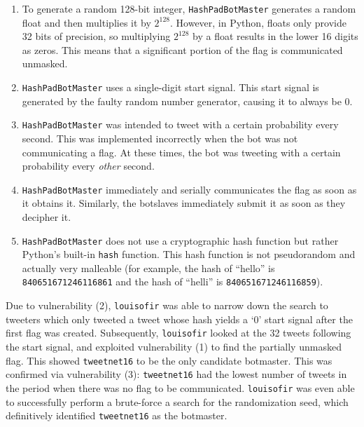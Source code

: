 \documentclass[11pt, oneside]{article} %
\numberwithin{equation}{section} %
\numberwithin{figure}{section} %
\numberwithin{table}{section} %
\renewcommand{\c}[1]{\texttt{#1}}
\newcommand{\teamol}{\c{louisofir}}
\begin{document}
            \begin{enumerate}
				\item To generate a random 128-bit integer, \c{HashPadBotMaster} generates a random float and then multiplies it by $2^{128}$. However, in Python, floats only provide 32 bits of precision, so multiplying $2^{128}$ by a float results in the lower 16 digits as zeros. This means that a significant portion of the flag is communicated unmasked.
                
				\item \c{HashPadBotMaster} uses a single-digit start signal.  This start signal is generated by the faulty random number generator, causing it to always be $0$.
                
				\item \c{HashPadBotMaster} was intended to tweet with a certain probability every second.  This was implemented incorrectly when the bot was not communicating a flag.  At these times, the bot was tweeting with a certain probability every \emph{other} second.
                
				\item \c{HashPadBotMaster} immediately and serially communicates the flag as soon as it obtains it.  Similarly, the botslaves immediately submit it as soon as they decipher it.
                
				\item \c{HashPadBotMaster} does not use a cryptographic hash function but rather Python's built-in \c{hash} function.  This hash function is not pseudorandom and actually very malleable (for example, the hash of ``hello'' is \c{840651671246116861} and the hash of ``helli'' is \c{840651671246116859}).
                
			\end{enumerate}
            
			Due to vulnerability (2), \teamol{} was able to narrow down the search to tweeters which only tweeted a tweet whose hash yields a `0' start signal after the first flag was created.  Subsequently, \teamol{} looked at the 32 tweets following the start signal, and exploited vulnerability (1) to find the partially unmasked flag.  This showed \c{tweetnet16} to be the only candidate botmaster.  This was confirmed via vulnerability (3): \c{tweetnet16} had the lowest number of tweets in the period when there was no flag to be communicated.  \teamol{} was even able to successfully perform a brute-force a search for the randomization seed, which definitively identified \c{tweetnet16} as the botmaster.
\end{document}
